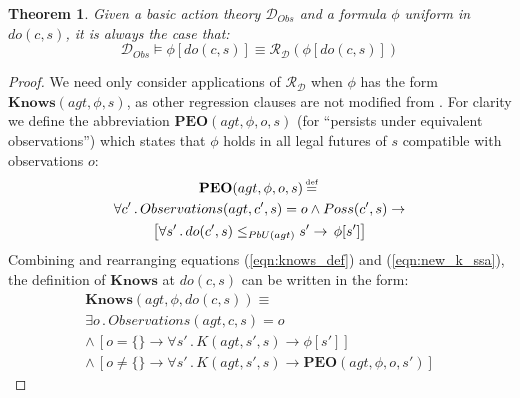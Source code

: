 \documentclass{ifaamas-submission}
\newcommand{\isdef}{\hbox{$\stackrel{\mbox{\tiny def}}{=}$}}
\newtheorem{theorem}{Theorem}
\begin{document}
\begin{theorem}%
Given a basic action theory $\mathcal{D}_{Obs}$ and a formula $\phi$
uniform in $do(c,s)$, it is always the case that:\[
\mathcal{D}_{Obs}\models\phi[do(c,s)]\equiv\mathcal{R}_{\mathcal{D}}(\phi[do(c,s)])\]
 
\end{theorem}%
\begin{proof}%
We need only consider applications of $\mathcal{R}_{\mathcal{D}}$
when $\phi$ has the form $\mathbf{Knows}(agt,\phi,s)$, as other
regression clauses are not modified from \cite{scherl03sc_knowledge}.
For clarity we define the abbreviation $\mathbf{PEO}(agt,\phi,o,s)$
(for {}``persists under equivalent observations'') which states
that $\phi$ holds in all legal futures of $s$ compatible with observations
$o$:\begin{multline*}
\mathbf{PEO}(agt,\phi,o,s)\,\isdef\,\\
\forall c'\,.\, Observations(agt,c',s)=o\wedge Poss(c',s)\rightarrow\\
\left[\forall s'\,.\, do(c',s)\leq_{PbU(agt)}s'\rightarrow\,\phi[s']\right]\end{multline*}
 Combining and rearranging equations (\ref{eqn:knows_def}) and (\ref{eqn:new_k_ssa}),
the definition of $\mathbf{Knows}$ at $do(c,s)$ can be written in
the form: \begin{multline*}
\mathbf{Knows}(agt,\phi,do(c,s))\equiv\\
\exists o\,.\, Observations(agt,c,s)=o\\
\wedge\,\left[o=\{\}\rightarrow\forall s'\,.\, K(agt,s',s)\rightarrow\phi[s']\right]\\
\wedge\,\left[o\neq\{\}\rightarrow\forall s'\,.\, K(agt,s',s)\rightarrow\mathbf{PEO}(agt,\phi,o,s')\right]\end{multline*}



\end{proof}
\end{document}
